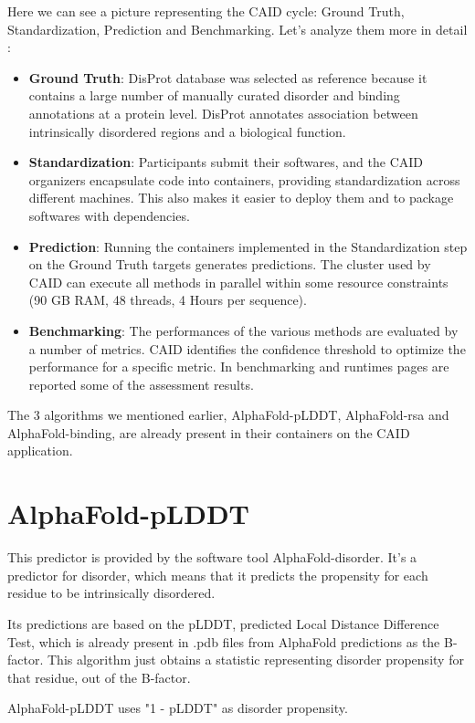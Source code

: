 Here we can see a picture representing the CAID cycle: Ground Truth, Standardization, Prediction and Benchmarking. Let's analyze them more in detail :
\begin{itemize}
    \item \textbf{Ground Truth}: DisProt database was selected as reference because it contains a large number of manually curated disorder and binding annotations at a protein level. DisProt annotates association between intrinsically disordered regions and a biological function.
    \item \textbf{Standardization}: Participants submit their softwares, and the CAID organizers encapsulate code into containers, providing standardization across different machines. This also makes it easier to deploy them and to package softwares with dependencies.
    \item \textbf{Prediction}: Running the containers implemented in the Standardization step on the Ground Truth targets generates predictions. The cluster used by CAID can execute all methods in parallel within some resource constraints (90 GB RAM, 48 threads, 4 Hours per sequence).
    \item \textbf{Benchmarking}: The performances of the various methods are evaluated by a number of metrics. CAID identifies the confidence threshold to optimize the performance for a specific metric. In benchmarking and runtimes pages are reported some of the assessment results.
\end{itemize}

The 3 algorithms we mentioned earlier, AlphaFold-pLDDT, AlphaFold-rsa and AlphaFold-binding, are already present in their containers on the CAID application.

\pagebreak

\section{AlphaFold-pLDDT}
This predictor is provided by the software tool AlphaFold-disorder. It's a predictor for disorder, which means that it predicts the propensity for each residue to be intrinsically disordered.

Its predictions are based on the pLDDT, predicted Local Distance Difference Test, which is already present in .pdb files from AlphaFold predictions as the B-factor. This algorithm just obtains a statistic representing disorder propensity for that residue, out of the B-factor.

AlphaFold-pLDDT uses "1 - pLDDT" as disorder propensity. 

